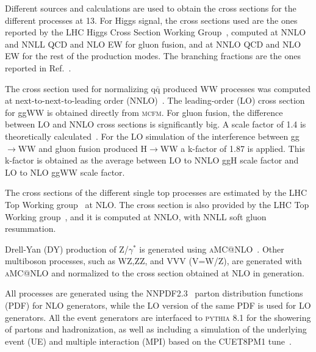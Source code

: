 Different sources and calculations are used to obtain the cross sections for the different processes at 13\TeV. 
For Higgs signal, the cross sections used are the ones reported by the LHC Higgs Cross Section Working Group~\cite{temphiggsxsecs},
computed at NNLO and NNLL QCD and NLO EW for gluon fusion, and at NNLO QCD and NLO EW for the rest of the production modes.
The branching fractions are the ones reported in Ref.~\cite{Heinemeyer:2013tqa}. 

The cross section used for normalizing $\mathrm{q\bar q}$ produced WW processes was computed at next-to-next-to-leading order
(NNLO)~\cite{Gehrmann:2014fva}. The leading-order (LO) cross section for ggWW is obtained directly from \textsc{mcfm}.
For gluon fusion, the difference between LO and NNLO cross sections is significantly big.
A scale factor of 1.4 is theoretically calculated~\cite{Caola:2015rqy}. For the LO simulation of the interference between 
gg$\rightarrow$WW and gluon fusion  produced H$\rightarrow$WW a k-factor of 1.87 is applied. 
This k-factor is obtained as the average between LO to NNLO ggH scale factor and LO to NLO ggWW scale factor. 

The cross sections of the different single top processes are estimated by the LHC Top Working group~\cite{singletop} at NLO.
The \ttbar cross section is also provided by the LHC Top Working group~\cite{topxsec}, and it is computed at NNLO, with NNLL soft gluon resummation. 

Drell-Yan (DY) production of Z/$\gamma^{*}$ is generated using \textsc{aMC@NLO}~\cite{Alwall:2014hca}. 
Other multiboson processes, such as WZ,ZZ, and VVV (V=W/Z), are generated with \textsc{aMC@NLO} and normalized
to the cross section obtained at NLO in generation.

All processes are generated using the NNPDF2.3~\cite{Ball:2013hta,Ball:2011uy} parton distribution functions (PDF) for NLO generators,
while the LO version of the same PDF is used for LO generators. All the event generators are interfaced 
to \textsc{pythia} 8.1 for the showering of partons and hadronization, as well as including a simulation of the 
underlying event (UE) and multiple interaction (MPI) based on the CUET8PM1 tune~\cite{Khachatryan:2015pea}. 
